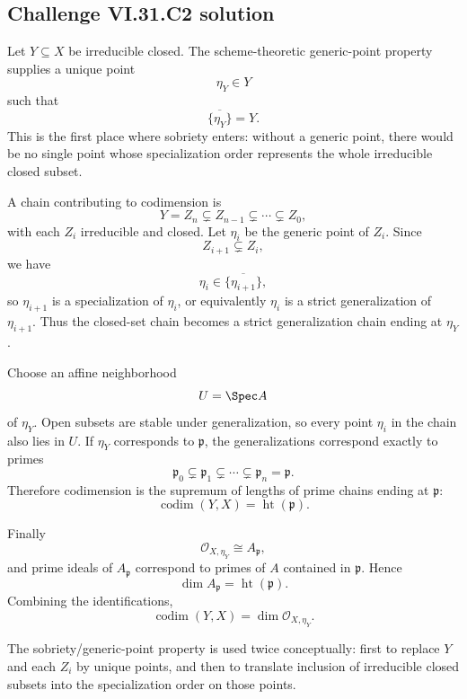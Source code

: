\subsection*{Challenge VI.31.C2 solution}
\begin{solution}
Let \(Y\subseteq X\) be irreducible closed.  The scheme-theoretic generic-point property supplies a unique point
\[
\eta_Y\in Y
\]
such that
\[
\overline{\{\eta_Y\}}=Y.
\]
This is the first place where sobriety enters: without a generic point, there would be no single point whose
specialization order represents the whole irreducible closed subset.

A chain contributing to codimension is
\[
Y=Z_n\subsetneq Z_{n-1}\subsetneq\cdots\subsetneq Z_0,
\]
with each \(Z_i\) irreducible and closed.  Let \(\eta_i\) be the generic point of \(Z_i\).  Since
\[
Z_{i+1}\subsetneq Z_i,
\]
we have
\[
\eta_i\in\overline{\{\eta_{i+1}\}},
\]
so \(\eta_{i+1}\) is a specialization of \(\eta_i\), or equivalently \(\eta_i\) is a strict generalization of
\(\eta_{i+1}\).  Thus the closed-set chain becomes a strict generalization chain ending at \(\eta_Y\).

Choose an affine neighborhood
\[
U=\Spec A
\]
of \(\eta_Y\).  Open subsets are stable under generalization, so every point \(\eta_i\) in the chain also lies in
\(U\).  If \(\eta_Y\) corresponds to \(\mathfrak p\), the generalizations correspond exactly to primes
\[
\mathfrak p_0\subsetneq\mathfrak p_1\subsetneq\cdots\subsetneq\mathfrak p_n=\mathfrak p.
\]
Therefore codimension is the supremum of lengths of prime chains ending at \(\mathfrak p\):
\[
\operatorname{codim}(Y,X)=\operatorname{ht}(\mathfrak p).
\]

Finally
\[
\mathcal O_{X,\eta_Y}\cong A_{\mathfrak p},
\]
and prime ideals of \(A_{\mathfrak p}\) correspond to primes of \(A\) contained in \(\mathfrak p\).  Hence
\[
\dim A_{\mathfrak p}=\operatorname{ht}(\mathfrak p).
\]
Combining the identifications,
\[
\boxed{
\operatorname{codim}(Y,X)=\dim\mathcal O_{X,\eta_Y}.
}
\]

The sobriety/generic-point property is used twice conceptually: first to replace \(Y\) and each \(Z_i\) by unique
points, and then to translate inclusion of irreducible closed subsets into the specialization order on those
points.
\end{solution}

